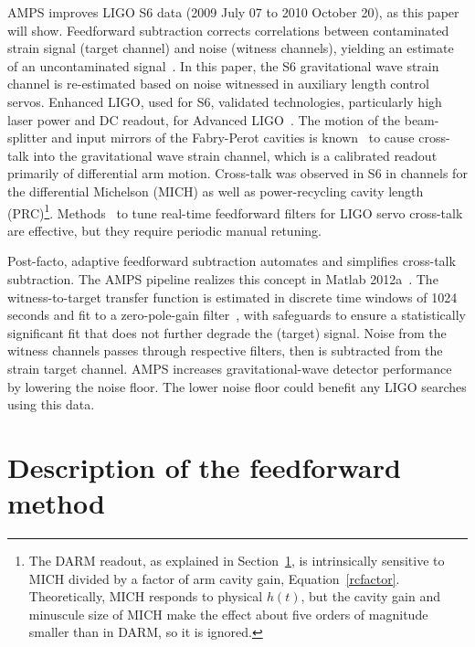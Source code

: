 AMPS improves LIGO S6 data (2009 July 07 to 2010 October 20), as this paper will show. Feedforward subtraction corrects correlations between contaminated strain signal (target channel) and noise (witness channels), yielding an estimate of an uncontaminated signal~\cite{AllenHuaOttewill1999}. In this paper, the S6 gravitational wave strain channel is re-estimated based on noise witnessed in auxiliary length control servos. Enhanced LIGO, used for S6, validated technologies, particularly high laser power and DC readout, for Advanced LIGO~\cite{Fricke2009}. The motion of the beam-splitter and input mirrors of the Fabry-Perot cavities is known~\cite{AdhikariThesis,BallmerThesis} to cause cross-talk into the gravitational wave strain channel, which is a calibrated readout primarily of differential arm motion. Cross-talk was observed in S6 in channels for the differential Michelson (MICH) as well as power-recycling cavity length (PRC)\footnote{The DARM readout, as explained in Section~\ref{motive_math}, is intrinsically sensitive to MICH divided by a factor of arm cavity gain, Equation~\ref{rcfactor}. Theoretically, MICH responds to physical $h(t)$, but the cavity gain and minuscule size of MICH make the effect about five orders of magnitude smaller than in DARM, so it is ignored.}. Methods~\cite{KisselThesis} to tune real-time feedforward filters for LIGO servo cross-talk are effective, but they require periodic manual retuning. 

Post-facto, adaptive feedforward subtraction automates and simplifies cross-talk subtraction. The AMPS pipeline realizes this concept in Matlab 2012a~\cite{Matlab2012a}. The witness-to-target transfer function is estimated in discrete time windows of 1024 seconds and fit to a zero-pole-gain filter~\cite{Deschrijver2008,Gustavsen1999,Gustavsen2006}, with safeguards to ensure a statistically significant fit that does not further degrade the (target) signal. Noise from the witness channels passes through respective filters, then is subtracted from the strain target channel. AMPS increases gravitational-wave detector performance by lowering the noise floor. The lower noise floor could benefit any LIGO searches using this data.


    \section{Description of the feedforward method}
    \label{motive_math}


